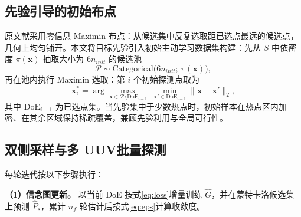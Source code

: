 \documentclass[a4paper,UTF8,zihao=5,twocolumn]{ctexart}
\numberwithin{equation}{section}
\begin{document}
\begin{table}[!t]
  \centering
  \caption{采集策略参数 Schema}
  \label{tab:schema}
\end{table}

\subsection{先验引导的初始布点}

原文献采用零信息 Maximin 布点：从候选集中反复选取距已选点最远的候选点，几何上均匀铺开。本文将目标先验引入初始主动学习数据集构建：先从 $S$ 中依密度 $\pi(\symbf{x})$ 抽取大小为 $6n_{init}$ 的候选池
\begin{equation}
  \mathcal{P}\sim\mathrm{Categorical}\bigl(6n_{init};\,\pi(\symbf{x})\bigr),
  \label{eq:pool}
\end{equation}
再在池内执行 Maximin 选取：第 $i$ 个初始探测点取为
\begin{equation}
  \symbf{x}_i^{\ast}=\arg\max_{\symbf{x}\in\mathcal{P}\setminus\mathrm{DoE}_{i-1}}\ \min_{\symbf{x}'\in\mathrm{DoE}_{i-1}}\|\symbf{x}-\symbf{x}'\|_2,
  \label{eq:maximin}
\end{equation}
其中 $\mathrm{DoE}_{i-1}$ 为已选点集。当先验集中于少数热点时，初始样本在热点区内加密、在其余区域保持稀疏覆盖，兼顾先验利用与全局可行性。

\subsection{双侧采样与多 UUV批量探测}

每轮迭代按以下步骤执行：

\textbf{（1）信念图更新。} 以当前 DoE 按式\eqref{eq:loss}增量训练 $\hat G$，并在蒙特卡洛候选集上预测 $\hat P_s$，累计 $n_f$ 轮估计后按式\eqref{eq:eps}计算收敛度。
\end{document}
